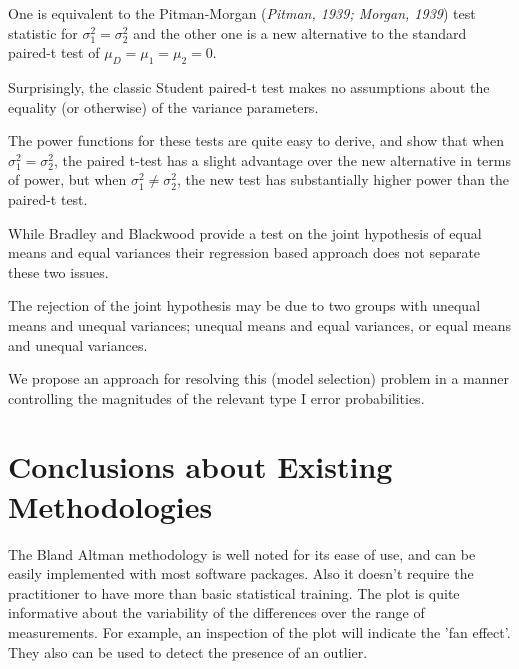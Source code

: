 \documentclass[12pt, a4paper]{report}
\theoremstyle{plain}
\theoremstyle{definition}
\theoremstyle{remark}
\begin{document}
One is equivalent to the Pitman-Morgan (\textit{Pitman, 1939; Morgan, 1939}) test statistic 
for $\sigma^2_1 = \sigma^2_2$ and the other one is a new alternative to the standard paired-t test of $\mu_D = \mu_1 = \mu_2 = 0$. 

Surprisingly, the classic Student paired-t test makes no assumptions about the equality (or otherwise) of the 
variance parameters. 

The power functions for these tests are quite easy to derive, and show that when $\sigma^2_1 = \sigma^2_2$, 
the paired t-test has a slight advantage over the new alternative in terms of power, but when $\sigma^2_1 \neq \sigma^2_2$, the 
new test has substantially higher power than the paired-t test.

While Bradley and Blackwood provide a test on the joint hypothesis of equal means and equal variances their regression 
based approach does not separate these two issues.

The rejection of the joint hypothesis may be 
due to two groups with unequal means and unequal variances; unequal means and equal variances, or equal means and unequal variances. 

We propose an approach for resolving this (model selection) problem in a manner controlling the magnitudes of the 
relevant type I error probabilities.





\section{Conclusions about Existing Methodologies}

The Bland Altman methodology is well noted for its ease of use,
and can be easily implemented with most software packages. Also it
doesn't require the practitioner to have more than basic
statistical training. The plot is quite informative about the
variability of the differences over the range of measurements. For
example, an inspection of the plot will indicate the 'fan effect'.
They also can be used to detect the presence of an outlier.
\end{document}
